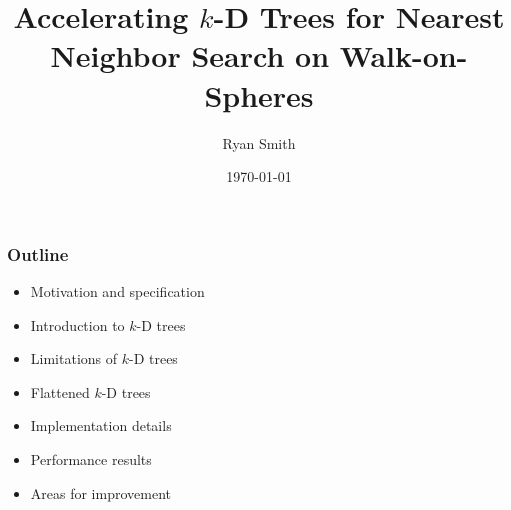 \documentclass[lualatex,aspectratio=169]{beamer}
\title{Accelerating $k$-D Trees for Nearest Neighbor Search on Walk-on-Spheres}
\date[\today]{\today}
\author[Ryan Smith]{Ryan Smith}
\newcommand{\kd}{$k$-D\xspace}
\begin{document}
\begin{frame}
  \titlepage
\end{frame}

\begin{frame} 

  \frametitle{Outline} 

  \begin{itemize} 
    \item Motivation and specification
    \item Introduction to \kd trees
    \item Limitations of \kd trees
    \item Flattened \kd trees
    \item Implementation details
    \item Performance results
    \item Areas for improvement
  \end{itemize}

\end{frame}


\end{document}

